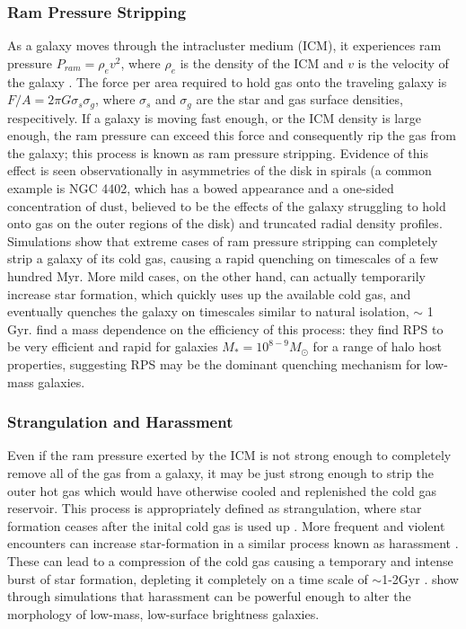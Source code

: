 \subsubsection{Ram Pressure Stripping}

As a galaxy moves through the intracluster medium (ICM), it experiences ram pressure $P_{ram} = \rho_e v^2$, where $\rho_e$ is the density of the ICM and $v$ is the velocity of the galaxy \citep{Gunn1972}. The force per area required to hold gas onto the traveling galaxy is $F/A = 2\pi G \sigma_{s} \sigma_{g}$, where $\sigma_{s}$ and $\sigma_{g}$ are the star and gas surface densities, respecitively. If a galaxy is moving fast enough, or the ICM density is large enough, the ram pressure can exceed this force and consequently rip the gas from the galaxy; this process is known as ram pressure stripping. Evidence of this effect is seen observationally in asymmetries of the disk in spirals (a common example is NGC 4402, which has a bowed appearance and a one-sided concentration of dust, believed to be the effects of the galaxy struggling to hold onto gas on the outer regions of the disk) and truncated radial density profiles. Simulations \citep{Steinhauser2016} show that extreme cases of ram pressure stripping can completely strip a galaxy of its cold gas, causing a rapid quenching on timescales of a few hundred Myr. More mild cases, on the other hand, can actually temporarily increase star formation, which quickly uses up the available cold gas, and eventually quenches the galaxy on timescales similar to natural isolation, $\sim$ 1 Gyr. \citet{Fillingham2016} find a mass dependence on the efficiency of this process: they find RPS to be very efficient and rapid for galaxies $M_{*} = 10^{8-9}M_{\odot}$ for a range of halo host properties, suggesting RPS may be the dominant quenching mechanism for low-mass galaxies.  

\subsubsection{Strangulation and Harassment}

Even if the ram pressure exerted by the ICM is not strong enough to completely remove all of the gas from a galaxy, it may be just strong enough to strip the outer hot gas which would have otherwise cooled and replenished the cold gas reservoir. This process is appropriately defined as strangulation, where star formation ceases after the inital cold gas is used up \citep{Larson1980}. More frequent and violent encounters can increase star-formation in a similar process known as harassment \citep{Moore1996}. These can lead to a compression of the cold gas causing a temporary and intense burst of star formation, depleting it completely on a time scale of $\sim$1-2Gyr \citep{Kawata2007}. \citet{Moore1999} show through simulations that harassment can be powerful enough to alter the morphology of low-mass, low-surface brightness galaxies. 

